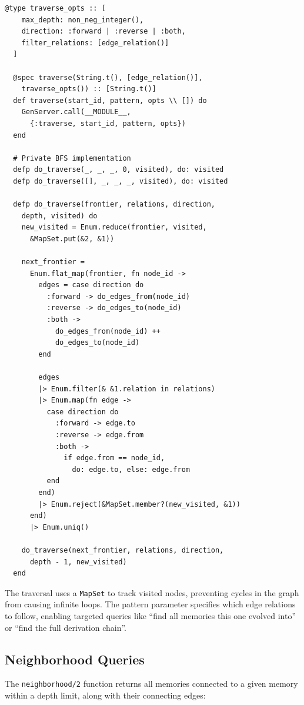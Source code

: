 \documentclass[12pt,a4paper]{article}
\theoremstyle{definition}
\begin{document}
\begin{lstlisting}[caption={BFS graph traversal with depth limiting.}, label={lst:graph-traverse}]
  @type traverse_opts :: [
    max_depth: non_neg_integer(),
    direction: :forward | :reverse | :both,
    filter_relations: [edge_relation()]
  ]

  @spec traverse(String.t(), [edge_relation()],
    traverse_opts()) :: [String.t()]
  def traverse(start_id, pattern, opts \\ []) do
    GenServer.call(__MODULE__,
      {:traverse, start_id, pattern, opts})
  end

  # Private BFS implementation
  defp do_traverse(_, _, _, 0, visited), do: visited
  defp do_traverse([], _, _, _, visited), do: visited

  defp do_traverse(frontier, relations, direction,
    depth, visited) do
    new_visited = Enum.reduce(frontier, visited,
      &MapSet.put(&2, &1))

    next_frontier =
      Enum.flat_map(frontier, fn node_id ->
        edges = case direction do
          :forward -> do_edges_from(node_id)
          :reverse -> do_edges_to(node_id)
          :both ->
            do_edges_from(node_id) ++
            do_edges_to(node_id)
        end

        edges
        |> Enum.filter(& &1.relation in relations)
        |> Enum.map(fn edge ->
          case direction do
            :forward -> edge.to
            :reverse -> edge.from
            :both ->
              if edge.from == node_id,
                do: edge.to, else: edge.from
          end
        end)
        |> Enum.reject(&MapSet.member?(new_visited, &1))
      end)
      |> Enum.uniq()

    do_traverse(next_frontier, relations, direction,
      depth - 1, new_visited)
  end
\end{lstlisting}

The traversal uses a \texttt{MapSet} to track visited nodes, preventing cycles in the graph from causing infinite loops.
The pattern parameter specifies which edge relations to follow, enabling targeted queries like ``find all memories this one evolved into'' or ``find the full derivation chain''.

\subsection{Neighborhood Queries}\label{subsec:neighborhood}

The \texttt{neighborhood/2} function returns all memories connected to a given memory within a depth limit, along with their connecting edges:
\end{document}
